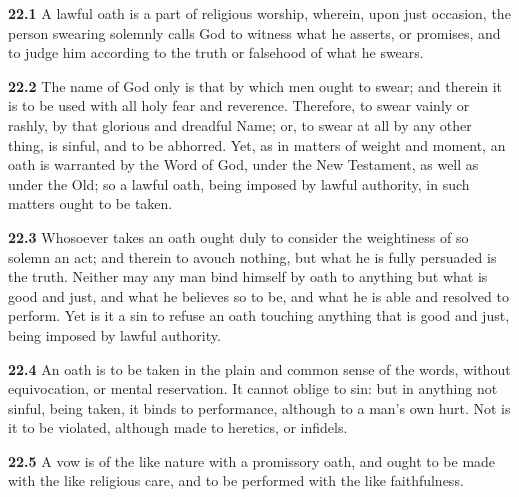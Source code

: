 \par\textbf{22.1} A lawful oath is a part of religious worship, wherein, upon just occasion, the person swearing solemnly calls God to witness what he asserts, or promises, and to judge him according to the truth or falsehood of what he swears.   

\par\textbf{22.2} The name of God only is that by which men ought to swear; and therein it is to be used with all holy fear and reverence. Therefore, to swear vainly or rashly, by that glorious and dreadful Name; or, to swear at all by any other thing, is sinful, and to be abhorred. Yet, as in matters of weight and moment, an oath is warranted by the Word of God, under the New Testament, as well as under the Old; so a lawful oath, being imposed by lawful authority, in such matters ought to be taken.   

\par\textbf{22.3} Whosoever takes an oath ought duly to consider the weightiness of so solemn an act; and therein to avouch nothing, but what he is fully persuaded is the truth. Neither may any man bind himself by oath to anything but what is good and just, and what he believes so to be, and what he is able and resolved to perform. Yet is it a sin to refuse an oath touching anything that is good and just, being imposed by lawful authority.   

\par\textbf{22.4} An oath is to be taken in the plain and common sense of the words, without equivocation, or mental reservation. It cannot oblige to sin: but in anything not sinful, being taken, it binds to performance, although to a man's own hurt. Not is it to be violated, although made to heretics, or infidels.   

\par\textbf{22.5} A vow is of the like nature with a promissory oath, and ought to be made with the like religious care, and to be performed with the like faithfulness.   

